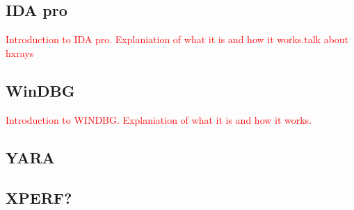\subsection{IDA pro}\label{IDA}
\textcolor{red}{Introduction to IDA pro. Explaniation of what it is and how it works.talk about hxrays}
\subsection{WinDBG}\label{Windbg}
\textcolor{red}{Introduction to WINDBG. Explaniation of what it is and how it works.}
\subsection{YARA}
\subsection{XPERF? }
